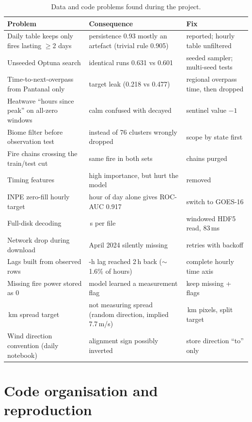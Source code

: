 \documentclass[11pt,a4paper,oneside]{report}
\begin{document}
\begin{table}[H]
\centering\small
\caption{Data and code problems found during the project.}
\label{tab:bugs}
\begin{tabularx}{\linewidth}{>{\raggedright\arraybackslash}p{3.6cm} >{\raggedright\arraybackslash}X >{\raggedright\arraybackslash}p{3.8cm}}
\toprule
Problem & Consequence & Fix \\
\midrule
Daily table keeps only fires lasting $\geq$2 days & persistence 0.93 mostly an artefact (trivial rule 0.905) & reported; hourly table unfiltered \\
Unseeded Optuna search & identical runs 0.631 vs 0.601 & seeded sampler; multi-seed tests \\
Time-to-next-overpass from Pantanal only & target leak (0.218 vs 0.477) & regional overpass time, then dropped \\
Heatwave \enquote{hours since peak} on all-zero windows & calm confused with decayed & sentinel value $-1$ \\
Biome filter before observation test & 433 instead of 76 clusters wrongly dropped & scope by state first \\
Fire chains crossing the train/test cut & same fire in both sets & chains purged \\
Timing features & high importance, but hurt the model & removed \\
INPE zero-fill hourly target & hour of day alone gives ROC-AUC 0.917 & switch to GOES-16 \\
Full-disk decoding & 3.3\,s per file & windowed HDF5 read, 83\,ms \\
Network drop during download & April 2024 silently missing & retries with backoff \\
Lags built from observed rows & 1-h lag reached 2\,h back ($\sim$1.6\% of hours) & complete hourly time axis \\
Missing fire power stored as 0 & model learned a measurement flag & keep missing + flags \\
28\,km spread target & not measuring spread (random direction, implied 7.7\,m/s) & 2\,km pixels, split target \\
Wind direction convention (daily notebook) & alignment sign possibly inverted & store direction \enquote{to} only \\
\bottomrule
\end{tabularx}
\end{table}

\chapter{Code organisation and reproduction}
\end{document}
